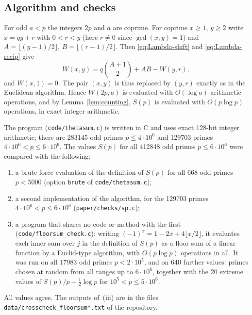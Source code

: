 \subsection{Algorithm and checks}
For odd $a<p$ the integers $2p$ and $a$ are coprime. For coprime $x\ge1$, $y\ge2$ write $x=qy+r$ with $0<r<y$ (here $r\ne0$ since $\gcd(x,y)=1$) and $A=\lfloor(y-1)/2\rfloor$, $B=\lfloor(r-1)/2\rfloor$. Then \eqref{eq:Lambda-shift} and \eqref{eq:Lambda-recip} give
\[
W(x,y)=q\binom{A+1}2+AB-W(y,r),
\]
and $W(x,1)=0$. The pair $(x,y)$ is thus replaced by $(y,r)$ exactly as in the Euclidean algorithm. Hence $W(2p,a)$ is evaluated with $O(\log a)$ arithmetic operations, and by Lemma~\ref{lem:counting}, $S(p)$ is evaluated with $O(p\log p)$ operations, in exact integer arithmetic.

The program (\texttt{code/thetasum.c}) is written in C and uses exact 128-bit integer arithmetic; there are 283145 odd primes $p\le4\cdot10^6$ and 129703 primes $4\cdot10^6<p\le6\cdot10^6$. The values $S(p)$ for all 412848 odd primes $p\le6\cdot10^6$ were compared with the following:
\begin{enumerate}[label=\textup{(\roman*)},leftmargin=*,nosep]
\item a brute-force evaluation of the definition of $S(p)$ for all 668 odd primes $p<5000$ (option \texttt{brute} of \texttt{code/thetasum.c});
\item a second implementation of the algorithm, for the 129703 primes $4\cdot10^6<p\le6\cdot10^6$ (\texttt{paper/checks/sp.c});
\item a program that shares no code or method with the first (\texttt{code/floorsum\_check.c}): writing $(-1)^x=1-2x+4\lfloor x/2\rfloor$, it evaluates each inner sum over $j$ in the definition of $S(p)$ as a floor sum of a linear function by a Euclid-type algorithm, with $O(p\log p)$ operations in all. It was run on all 17983 odd primes $p<2\cdot10^5$, and on 640 further values: primes chosen at random from all ranges up to $6\cdot10^6$, together with the 20 extreme values of $S(p)/p-\frac12\log p$ for $10^5<p\le5\cdot10^6$.
\end{enumerate}
All values agree. The outputs of~(iii) are in the files \texttt{data/crosscheck\_floorsum*.txt} of the repository.


